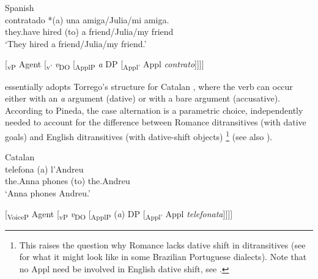 \documentclass[output=paper,colorlinks,citecolor=brown]{./langscibook}
\begin{document}
\ea%
    \label{ex:manzini:2}
    Spanish \citep{Torrego2010}\\
         {contratado}  {*(a)} {una} {amiga/Julia/mi} {amiga.}\\
        they.have   hired      (to) a friend/Julia/my friend\\
    \glt ‘They hired a friend/Julia/my friend.’
\z 

\ea%
    \label{ex:manzini:3}
    [\textsubscript{vP} Agent [\textsubscript{v’} \textit{v}\textsubscript{DO} [\textsubscript{ApplP} \textit{a} DP [\textsubscript{Appl’} Appl \textit{contrato}]]]]
\z

\citet[359-360]{Pineda2016} essentially adopts Torrego’s structure for Catalan , where the verb can occur either with an \textit{a} argument (dative) or with a bare argument (accusative). According to Pineda, the case alternation is a parametric choice, independently needed to account for the difference between Romance ditransitives (with dative goals) and English ditransitives (with dative-shift objects){} \footnote{This raises the question why Romance lacks dative shift in ditransitives (see \citet{Lima-Salles2016} for what it might look like in some Brazilian Portuguese dialects). Note that no Appl need be involved in English dative shift, see \citet{Kayne1984, Pesetsky1995, Harley2002, BeckJohnson2004}.} (see also \citealt{Pineda2014}).

\ea%
    \label{ex:manzini:4}
    Catalan \citep{Pineda2016}\\
       {telefona}   {(a)} {l’Andreu}\\
        the.Anna   phones   (to) the.Andreu\\
    \glt ‘Anna phones Andreu.’
\z

\ea%
    \label{ex:manzini:5}
    [\textsubscript{VoiceP}  Agent [\textsubscript{vP} \textit{v}\textsubscript{DO} [\textsubscript{ApplP} (\textit{a}) DP [\textsubscript{Appl’} Appl \textit{telefonata}]]]]\\
\z
\end{document}
